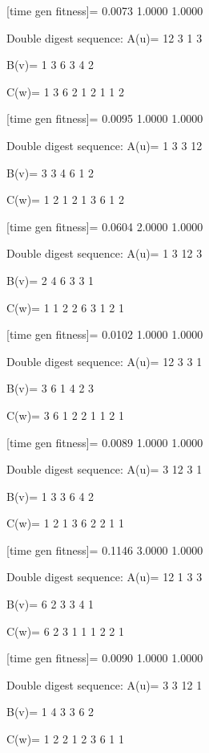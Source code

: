 [time gen fitness]=
    0.0073    1.0000    1.0000

Double digest sequence:
A(u)=
    12     3     1     3

B(v)=
     1     3     6     3     4     2

C(w)=
     1     3     6     2     1     2     1     1     2

[time gen fitness]=
    0.0095    1.0000    1.0000

Double digest sequence:
A(u)=
     1     3     3    12

B(v)=
     3     3     4     6     1     2

C(w)=
     1     2     1     2     1     3     6     1     2

[time gen fitness]=
    0.0604    2.0000    1.0000

Double digest sequence:
A(u)=
     1     3    12     3

B(v)=
     2     4     6     3     3     1

C(w)=
     1     1     2     2     6     3     1     2     1

[time gen fitness]=
    0.0102    1.0000    1.0000

Double digest sequence:
A(u)=
    12     3     3     1

B(v)=
     3     6     1     4     2     3

C(w)=
     3     6     1     2     2     1     1     2     1

[time gen fitness]=
    0.0089    1.0000    1.0000

Double digest sequence:
A(u)=
     3    12     3     1

B(v)=
     1     3     3     6     4     2

C(w)=
     1     2     1     3     6     2     2     1     1

[time gen fitness]=
    0.1146    3.0000    1.0000

Double digest sequence:
A(u)=
    12     1     3     3

B(v)=
     6     2     3     3     4     1

C(w)=
     6     2     3     1     1     1     2     2     1

[time gen fitness]=
    0.0090    1.0000    1.0000

Double digest sequence:
A(u)=
     3     3    12     1

B(v)=
     1     4     3     3     6     2

C(w)=
     1     2     2     1     2     3     6     1     1

